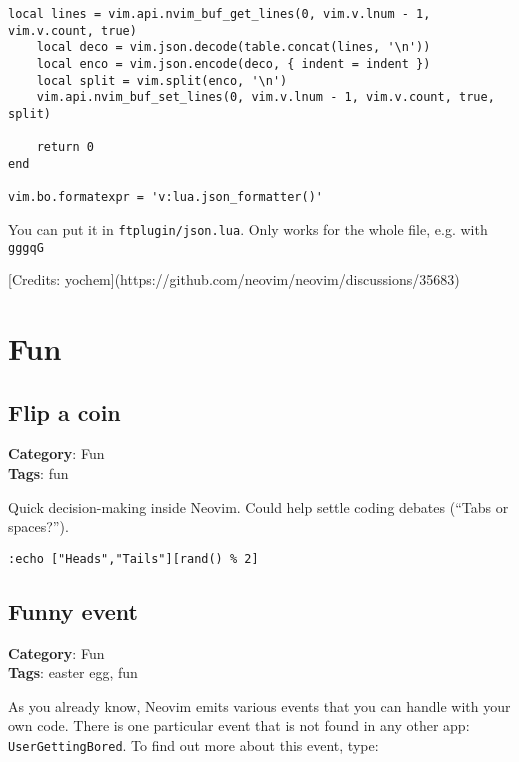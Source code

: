{{{{{{\begin{Exa*}{}
\begin{Verbatim}[fontsize=\footnotesize, breaklines, breakanywhere]
	local lines = vim.api.nvim_buf_get_lines(0, vim.v.lnum - 1, vim.v.count, true)
	local deco = vim.json.decode(table.concat(lines, '\n'))
	local enco = vim.json.encode(deco, { indent = indent })
	local split = vim.split(enco, '\n')
	vim.api.nvim_buf_set_lines(0, vim.v.lnum - 1, vim.v.count, true, split)

	return 0
end

vim.bo.formatexpr = 'v:lua.json_formatter()'
\end{Verbatim}
\end{Exa*}

You can put it in {\footnotesize \Verb§ftplugin/json.lua§}. Only works for the whole file, e.g. with {\footnotesize \Verb§gggqG§}

[Credits: yochem](https://github.com/neovim/neovim/discussions/35683)

\chapter{Fun}
\section{Flip a coin}

\textbf{Category}: Fun\\ \textbf{Tags}: fun
\vspace{0.5cm}

Quick decision-making inside Neovim. Could help settle coding debates (“Tabs or spaces?”).

\begin{Exa*}{}
\begin{Verbatim}[fontsize=\footnotesize, breaklines, breakanywhere]
:echo ["Heads","Tails"][rand() % 2]
\end{Verbatim}
\end{Exa*}

\section{Funny event}

\textbf{Category}: Fun\\ \textbf{Tags}: easter egg, fun
\vspace{0.5cm}

As you already know, Neovim emits various events that you can handle with your own code. There is one particular event that is not found in any other app: {\footnotesize \Verb§UserGettingBored§}. To find out more about this event, type:

}}}}}}
